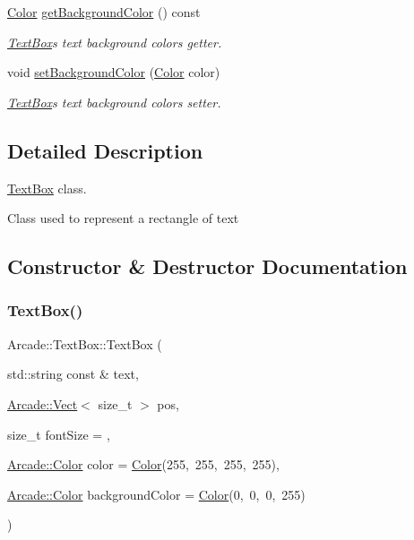 \begin{DoxyCompactItemize}
\hyperlink{class_arcade_1_1_color}{Color} \hyperlink{class_arcade_1_1_text_box_ab7f4529da65dcab7508563e32c55ddbe}{get\+Background\+Color} () const
\begin{DoxyCompactList}\small\item\em \hyperlink{class_arcade_1_1_text_box}{Text\+Box}\textquotesingle{}s text background color\textquotesingle{}s getter. \end{DoxyCompactList}\item 
void \hyperlink{class_arcade_1_1_text_box_a01f432d437ec9500bb8fc6383765f90b}{set\+Background\+Color} (\hyperlink{class_arcade_1_1_color}{Color} color)
\begin{DoxyCompactList}\small\item\em \hyperlink{class_arcade_1_1_text_box}{Text\+Box}\textquotesingle{}s text background color\textquotesingle{}s setter. \end{DoxyCompactList}\end{DoxyCompactItemize}


\subsection{Detailed Description}
\hyperlink{class_arcade_1_1_text_box}{Text\+Box} class. 

Class used to represent a rectangle of text 

\subsection{Constructor \& Destructor Documentation}
\mbox{\label{class_arcade_1_1_text_box_ad906f51406be8703146d7fe4eac0a7df}} 
\subsubsection{\texorpdfstring{Text\+Box()}{TextBox()}}
{\footnotesize\ttfamily Arcade\+::\+Text\+Box\+::\+Text\+Box (\begin{DoxyParamCaption}\item[{std\+::string const \&}]{text,  }\item[{\hyperlink{class_arcade_1_1_vect}{Arcade\+::\+Vect}$<$ size\+\_\+t $>$}]{pos,  }\item[{size\+\_\+t}]{font\+Size = {},  }\item[{\hyperlink{class_arcade_1_1_color}{Arcade\+::\+Color}}]{color = {\ttfamily \hyperlink{class_arcade_1_1_color}{Color}(255,~255,~255,~255)},  }\item[{\hyperlink{class_arcade_1_1_color}{Arcade\+::\+Color}}]{background\+Color = {\ttfamily \hyperlink{class_arcade_1_1_color}{Color}(0,~0,~0,~255)} }\end{DoxyParamCaption})}



